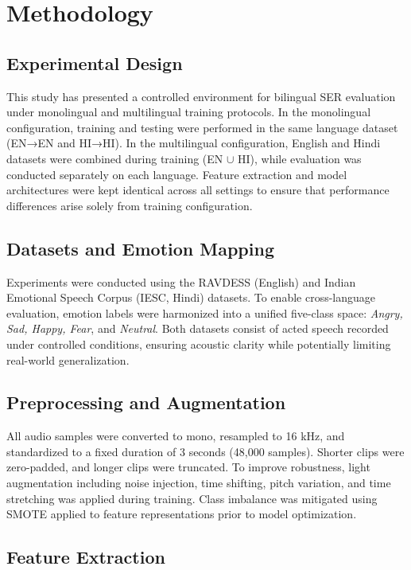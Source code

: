 \documentclass[runningheads]{llncs}
\begin{document}
\section{Methodology}

\subsection{Experimental Design}

This study has presented a controlled environment for bilingual SER evaluation under monolingual and multilingual training protocols. In the monolingual configuration, training and testing were performed in the same language dataset (EN→EN and HI→HI). In the multilingual configuration, English and Hindi datasets were combined during training (EN $\cup$ HI), while evaluation was conducted separately on each language. Feature extraction and model architectures were kept identical across all settings to ensure that performance differences arise solely from training configuration.

\subsection{Datasets and Emotion Mapping}

Experiments were conducted using the RAVDESS (English) and Indian Emotional Speech Corpus (IESC, Hindi) datasets. To enable cross-language evaluation, emotion labels were harmonized into a unified five-class space: \textit{Angry, Sad, Happy, Fear}, and \textit{Neutral}. Both datasets consist of acted speech recorded under controlled conditions, ensuring acoustic clarity while potentially limiting real-world generalization.

\subsection{Preprocessing and Augmentation}

All audio samples were converted to mono, resampled to 16 kHz, and standardized to a fixed duration of 3 seconds (48,000 samples). Shorter clips were zero-padded, and longer clips were truncated. To improve robustness, light augmentation including noise injection, time shifting, pitch variation, and time stretching was applied during training. Class imbalance was mitigated using SMOTE applied to feature representations prior to model optimization.

\subsection{Feature Extraction}
\end{document}
